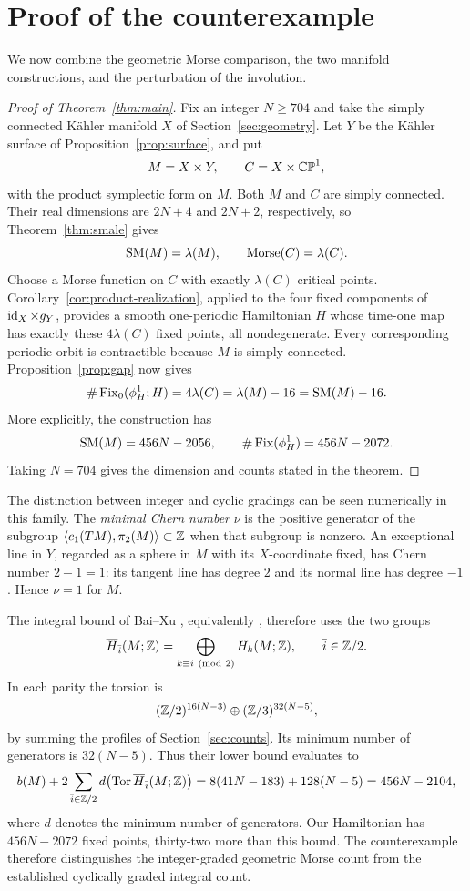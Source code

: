 \section{Proof of the counterexample}
\label{sec:assembly}

We now combine the geometric Morse comparison, the two manifold constructions, and the perturbation of the involution.

\begin{proof}[Proof of Theorem~\ref{thm:main}]
Fix an integer $N\geq704$ and take the simply connected Kähler manifold $X$ of Section~\ref{sec:geometry}. Let $Y$ be the Kähler surface of Proposition~\ref{prop:surface}, and put
\[
 M=X\times Y,\qquad C=X\times\mathbb{CP}^1,
\]
with the product symplectic form on $M$. Both $M$ and $C$ are simply connected. Their real dimensions are $2N+4$ and $2N+2$, respectively, so Theorem~\ref{thm:smale} gives
\[
 \operatorname{SM}(M)=\lambda(M),\qquad \operatorname{Morse}(C)=\lambda(C).
\]
Choose a Morse function on $C$ with exactly $\lambda(C)$ critical points. Corollary~\ref{cor:product-realization}, applied to the four fixed components of $\operatorname{id}_X\times g_Y$, provides a smooth one-periodic Hamiltonian $H$ whose time-one map has exactly these $4\lambda(C)$ fixed points, all nondegenerate. Every corresponding periodic orbit is contractible because $M$ is simply connected. Proposition~\ref{prop:gap} now gives
\[
 \#\operatorname{Fix}_0(\phi_H^1;H)=4\lambda(C)=\lambda(M)-16=\operatorname{SM}(M)-16.
\]
More explicitly, the construction has
\[
 \operatorname{SM}(M)=456N-2056,\qquad
 \#\operatorname{Fix}(\phi_H^1)=456N-2072.
\]
Taking $N=704$ gives the dimension and counts stated in the theorem.
\end{proof}

\begin{remark}\label{rem:periodic-bound}
The distinction between integer and cyclic gradings can be seen numerically in this family. The \emph{minimal Chern number} $\nu$ is the positive generator of the subgroup $\langle c_1(TM),\pi_2(M)\rangle\subset\mathbb Z$ when that subgroup is nonzero. An exceptional line in $Y$, regarded as a sphere in $M$ with its $X$-coordinate fixed, has Chern number $2-1=1$: its tangent line has degree $2$ and its normal line has degree $-1$. Hence $\nu=1$ for $M$.

The integral bound of Bai--Xu \cite[Theorem~A]{BaiXu2022}, equivalently \cite[Corollary~1.2]{BaiXu2026}, therefore uses the two groups
\[
 \overline H_{\bar i}(M;\Z)=\bigoplus_{k\equiv i\ (\mathrm{mod}\ 2)}H_k(M;\Z),
 \qquad \bar i\in\Z/2.
\]
In each parity the torsion is
\[
 (\mathbb Z/2)^{16(N-3)}\oplus(\mathbb Z/3)^{32(N-5)},
\]
by summing the profiles of Section~\ref{sec:counts}. Its minimum number of generators is $32(N-5)$. Thus their lower bound evaluates to
\[
 b(M)+2\sum_{\bar i\in\mathbb Z/2}d\bigl(\operatorname{Tor}\overline H_{\bar i}(M;\mathbb Z)\bigr)
 =8(41N-183)+128(N-5)=456N-2104,
\]
where $d$ denotes the minimum number of generators. Our Hamiltonian has $456N-2072$ fixed points, thirty-two more than this bound. The counterexample therefore distinguishes the integer-graded geometric Morse count from the established cyclically graded integral count.
\end{remark}
